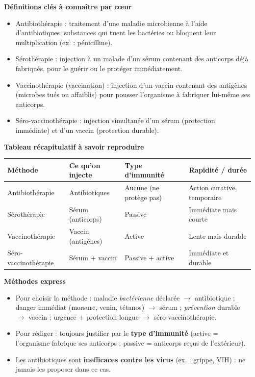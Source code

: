 \documentclass[11pt]{article}
\newcommand{\cle}[1]{{\popxbold\color{popdark}#1}}
\begin{document}
\begin{bilan}
\textbf{Définitions clés à connaître par cœur}
\begin{itemize}
  \item \cle{Antibiothérapie} : traitement d'une maladie microbienne à l'aide d'\cle{antibiotiques}, substances qui tuent les bactéries ou bloquent leur multiplication (ex. : pénicilline).
  \item \cle{Sérothérapie} : injection à un malade d'un \cle{sérum} contenant des \cle{anticorps} déjà fabriqués, pour le guérir ou le protéger immédiatement.
  \item \cle{Vaccinothérapie} (vaccination) : injection d'un \cle{vaccin} contenant des \cle{antigènes} (microbes tués ou affaiblis) pour pousser l'organisme à fabriquer lui-même ses anticorps.
  \item \cle{Séro-vaccinothérapie} : injection simultanée d'un sérum (protection immédiate) et d'un vaccin (protection durable).
\end{itemize}

\textbf{Tableau récapitulatif à savoir reproduire}
\begin{center}
\begin{tabularx}{\linewidth}{|l|X|X|X|}
\hline
\rowcolor{popblueL} \textbf{Méthode} & \textbf{Ce qu'on injecte} & \textbf{Type d'immunité} & \textbf{Rapidité / durée} \\
\hline
Antibiothérapie & Antibiotiques & Aucune (ne protège pas) & Action curative, temporaire \\
\hline
Sérothérapie & Sérum (anticorps) & Passive & Immédiate mais courte \\
\hline
Vaccinothérapie & Vaccin (antigènes) & Active & Lente mais durable \\
\hline
Séro-vaccinothérapie & Sérum + vaccin & Passive + active & Immédiate et durable \\
\hline
\end{tabularx}
\end{center}

\textbf{Méthodes express}
\begin{itemize}
  \item Pour choisir la méthode : maladie \emph{bactérienne} déclarée $\rightarrow$ antibiotique ; danger immédiat (morsure, venin, tétanos) $\rightarrow$ sérum ; \emph{prévention} durable $\rightarrow$ vaccin ; urgence + protection longue $\rightarrow$ séro-vaccinothérapie.
  \item Pour rédiger : toujours justifier par le \textbf{type d'immunité} (active = l'organisme fabrique ses anticorps ; passive = anticorps reçus de l'extérieur).
  \item Les antibiotiques sont \textbf{inefficaces contre les virus} (ex. : grippe, VIH) : ne jamais les proposer dans ce cas.
\end{itemize}
\end{bilan}
\end{document}
